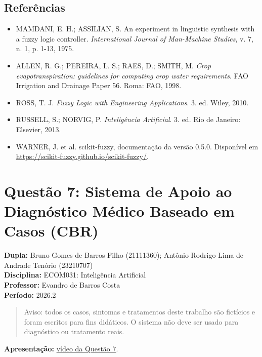 \documentclass[12pt, a4paper]{article}
\providecommand{\tightlist}{%
  \setlength{\itemsep}{0pt}\setlength{\parskip}{0pt}}
\begin{document}
\subsection{Referências}\label{referuxeancias}

\begin{itemize}
\tightlist
\item
  MAMDANI, E. H.; ASSILIAN, S. An experiment in linguistic synthesis with a fuzzy logic controller. \emph{International Journal of Man-Machine Studies}, v. 7, n. 1, p. 1-13, 1975.
\item
  ALLEN, R. G.; PEREIRA, L. S.; RAES, D.; SMITH, M. \emph{Crop evapotranspiration: guidelines for computing crop water requirements}. FAO Irrigation and Drainage Paper 56. Roma: FAO, 1998.
\item
  ROSS, T. J. \emph{Fuzzy Logic with Engineering Applications}. 3. ed. Wiley, 2010.
\item
  RUSSELL, S.; NORVIG, P. \emph{Inteligência Artificial}. 3. ed. Rio de Janeiro: Elsevier, 2013.
\item
  WARNER, J. et al. scikit-fuzzy, documentação da versão 0.5.0. Disponível em \url{https://scikit-fuzzy.github.io/scikit-fuzzy/}.
\end{itemize}

\section{Questão 7: Sistema de Apoio ao Diagnóstico Médico Baseado em Casos (CBR)}
\label{sec:q7}

\textbf{Dupla:} Bruno Gomes de Barros Filho (21111360); Antônio Rodrigo Lima de Andrade Tenório (23210707)\\
\textbf{Disciplina:} ECOM031: Inteligência Artificial\\
\textbf{Professor:} Evandro de Barros Costa\\
\textbf{Período:} 2026.2

\begin{quote}
Aviso: todos os casos, sintomas e tratamentos deste trabalho são fictícios e foram escritos para fins didáticos. O sistema não deve ser usado para diagnóstico ou tratamento reais.
\end{quote}

\textbf{Apresentação:} \href{https://drive.google.com/file/d/1ChSCUUCaMIf4aQYP_oj0H3rvu2dDnASl/view?usp=drive_link}{vídeo da Questão 7}.
\end{document}
